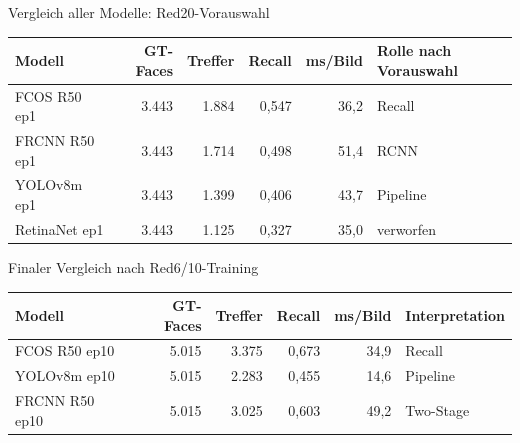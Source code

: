 \begin{frame}{Vergleich aller Modelle: Red20-Vorauswahl}
\tiny
\begin{tabular}{l r r r r l}
\toprule
Modell & GT-Faces & Treffer & Recall & ms/Bild & Rolle nach Vorauswahl \\
\midrule
FCOS R50 ep1 & 3.443 & 1.884 & 0,547 & 36,2 & Recall \\
FRCNN R50 ep1 & 3.443 & 1.714 & 0,498 & 51,4 & RCNN \\
YOLOv8m ep1 & 3.443 & 1.399 & 0,406 & 43,7 & Pipeline \\
RetinaNet ep1 & 3.443 & 1.125 & 0,327 & 35,0 & verworfen \\
\bottomrule
\end{tabular}
\end{frame}

\begin{frame}{Finaler Vergleich nach Red6/10-Training}
\tiny
\begin{tabular}{l r r r r l}
\toprule
Modell & GT-Faces & Treffer & Recall & ms/Bild & Interpretation \\
\midrule
FCOS R50 ep10 & 5.015 & 3.375 & 0,673 & 34,9 & Recall \\
YOLOv8m ep10 & 5.015 & 2.283 & 0,455 & 14,6 & Pipeline \\
FRCNN R50 ep10 & 5.015 & 3.025 & 0,603 & 49,2 & Two-Stage \\
\bottomrule
\end{tabular}
\end{frame}
